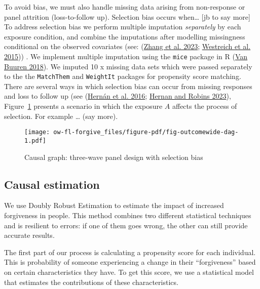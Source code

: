 \documentclass[
  singlecolumn]{report}
\begin{document}
To avoid bias, we must also handle missing data arising from
non-response or panel attrition (loss-to-follow up). Selection bias
occurs when\ldots{} {[}jb to say more{]} To address selection bias we
perform multiple imputation \emph{separately} by each exposure
condition, and combine the imputations after modelling missingness
conditional on the observed covariates (see:
(\protect\hyperlink{ref-zhang2023}{Zhang et al. 2023};
\protect\hyperlink{ref-westreich2015}{Westreich et al. 2015})) . We
implement multiple imputation using the \texttt{mice} package in R
(\protect\hyperlink{ref-vanbuuren2018}{Van Buuren 2018}). We imputed 10
x missing data sets which were passed separately to the the
\texttt{MatchThem} and \texttt{WeightIt} packages for propensity score
matching. There are several ways in which selection bias can occur from
missing responses and loss to follow up (see
(\protect\hyperlink{ref-hernuxe1n2016}{Hernán et al. 2016};
\protect\hyperlink{ref-hernan2023}{Hernan and Robins 2023}),
Figure~\ref{fig-outcomewide-dag} presents a scenario in which the
exposure \(A\) affects the process of selection. For example \ldots{}
(say more).

\begin{figure}

{\centering \texttt{[image: ow-fl-forgive\_files/figure-pdf/fig-outcomewide-dag-1.pdf]}

}

\caption{\label{fig-outcomewide-dag}Causal graph: three-wave panel
design with selection bias}

\end{figure}

\hypertarget{causal-estimation}{%
\subsection{Causal estimation}\label{causal-estimation}}

We use Doubly Robust Estimation to estimate the impact of increased
forgiveness in people. This method combines two different statistical
techniques and is resilient to errors: if one of them goes wrong, the
other can still provide accurate results.

The first part of our process is calculating a propensity score for each
individual. This is probability of someone experiencing a change in
their ``forgiveness'' based on certain characteristics they have. To get
this score, we use a statistical model that estimates the contributions
of these characteristics.
\end{document}

